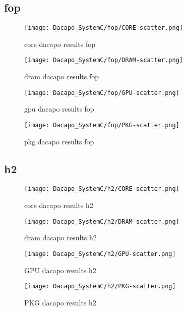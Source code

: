 \documentclass{article}
\begin{document}
\subsection{fop}
    \begin{figure}[H]
    	\centering
    	\texttt{[image: Dacapo\_SystemC/fop/CORE-scatter.png]}
    	\caption{core dacapo results fop}
    	\label{fig:fop-CORE}
    \end{figure}
    \begin{figure}[H]
    	\centering
    	\texttt{[image: Dacapo\_SystemC/fop/DRAM-scatter.png]}
    	\caption{dram dacapo results fop}
    	\label{fig:fop-DRAM}
    \end{figure}
    \begin{figure}[H]
    	\centering
    	\texttt{[image: Dacapo\_SystemC/fop/GPU-scatter.png]}
    	\caption{gpu dacapo results fop}
    	\label{fig:fop-GPU}
    \end{figure}
    \begin{figure}[H]
    	\centering
    	\texttt{[image: Dacapo\_SystemC/fop/PKG-scatter.png]}
    	\caption{pkg dacapo results fop}
    	\label{fig:fop-PKG}
    \end{figure}

\subsection{h2}
    \begin{figure}[H]
    	\centering
    	\texttt{[image: Dacapo\_SystemC/h2/CORE-scatter.png]}
    	\caption{core dacapo results h2}
    	\label{fig:h2-CORE}
    \end{figure}
    \begin{figure}[H]
    	\centering
    	\texttt{[image: Dacapo\_SystemC/h2/DRAM-scatter.png]}
    	\caption{dram dacapo results h2}
    	\label{fig:h2-DRAM}
    \end{figure}
    \begin{figure}[H]
    	\centering
    	\texttt{[image: Dacapo\_SystemC/h2/GPU-scatter.png]}
    	\caption{GPU dacapo results h2}
    	\label{fig:h2-GPU}
    \end{figure}
    \begin{figure}[H]
    	\centering
    	\texttt{[image: Dacapo\_SystemC/h2/PKG-scatter.png]}
    	\caption{PKG dacapo results h2}
    	\label{fig:h2-PKG}
    \end{figure}
    
\end{document}
